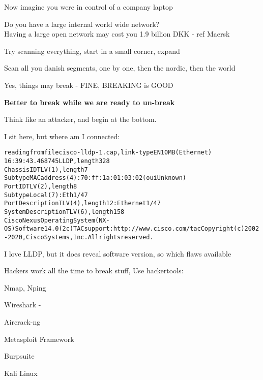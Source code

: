 \documentclass[Screen16to9,17pt]{foils}
\begin{document}



\begin{list2}
\item Now imagine you were in control of a company laptop
\item Do you have a large internal world wide network?\\
Having a large open network may cost you 1.9 billion DKK - ref Maersk
\item Try scanning everything, start in a small corner, expand
\item Scan all you danish segments, one by one, then the nordic, then the world
\item Yes, things may break - FINE, BREAKING is GOOD
\end{list2}

\centerline{\bf Better to break while we are ready to un-break}


Think like an attacker, and begin at the bottom.

I sit here, but where am I connected:
\begin{alltt}\footnotesize
reading from file cisco-lldp-1.cap, link-type EN10MB (Ethernet)
16:39:43.468745 LLDP, length 328
        Chassis ID TLV (1), length 7
          Subtype MAC address (4): 70:ff:1a:01:03:02 (oui Unknown)
        Port ID TLV (2), length 8
          Subtype Local (7): Eth1/47
        Port Description TLV (4), length 12: Ethernet1/47
        System Description TLV (6), length 158
          Cisco Nexus Operating System (NX-OS) Software 14.0(2c) TAC support: http://www.cisco.com/tac Copyright (c) 2002-2020, Cisco Systems, Inc. All rights reserved.
\end{alltt}

\vskip 5mm
\centerline{I love LLDP, but it does reveal software version, so which flaws available}




\begin{list2}
\item Hackers work all the time to break stuff, Use hackertools:
\item Nmap, Nping 
\item Wireshark - 
\item Aircrack-ng 
\item Metasploit Framework 
\item Burpsuite 
\item Kali Linux 
\end{list2}
\end{document}
